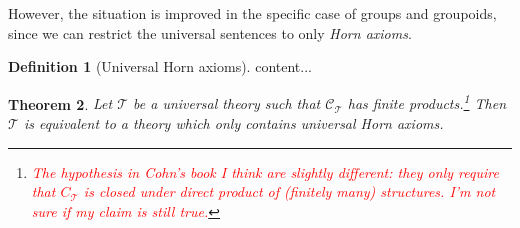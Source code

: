 \documentclass{article}
\theoremstyle{plain}
\newtheorem{thm}{Theorem}[section]
\theoremstyle{definition}
\newtheorem{defn}[thm]{Definition}
\begin{document}
	
	
	However, the situation is improved in the specific case of groups and groupoids, since we can restrict the universal sentences to only \emph{Horn axioms}.
	\begin{defn}[Universal Horn axioms]
		content...
	\end{defn}
	\begin{thm}
		Let $\mathcal{T}$ be a universal theory such that $\mathcal{C}_{\mathcal{T}}$ has finite products.\footnote{\textcolor{red}{The hypothesis in Cohn's book I think are slightly different: they only require that $C_\mathcal{T}$ is closed under direct product of (finitely many) structures. I'm not sure if my claim is still true.}} Then $\mathcal{T}$ is equivalent to a theory which only contains universal Horn axioms.
	\end{thm}
\end{document}
